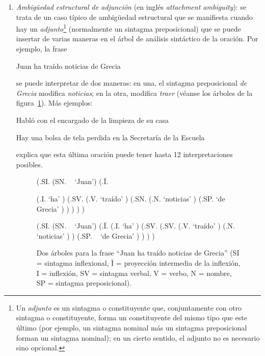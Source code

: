 \begin{enumerate}
\item \emph{Ambigüedad estructural de adjunción} (en inglés \emph{attachment ambiguity}): se trata de un caso típico de ambigüedad estructural que se manifiesta cuando hay un {\em adjunto}\footnote{Un \emph{adjunto} es un sintagma o constituyente que, conjuntamente con otro sintagma o constituyente, forma un constituyente del mismo tipo que este último (por ejemplo, un sintagma nominal más un sintagma preposicional forman un sintagma nominal); en un cierto sentido, el adjunto no es necesario sino opcional.} (normalmente un sintagma preposicional) que se puede insertar de varias maneras en el árbol de análisis sintáctico de la oración. Por ejemplo, la frase \begin{exemple} Juan ha traído noticias de Grecia \end{exemple} se puede interpretar de dos maneras: en una, el sintagma preposicional \emph{de Grecia} modifica \emph{noticias}; en la otra, modifica \emph{traer} (véanse los árboles de la figura~\ref{fg:noticies}). Más ejemplos: \begin{exemple} Habló con el encargado de la limpieza de su casa \end{exemple} \begin{exemple} Hay una bolsa de tela perdida en la Secretaría de la Escuela \label{ex:bossa} \end{exemple} \citet{tuson99b} explica que esta última oración puede tener hasta 12 interpretaciones posibles. 

\begin{figure} \begin{center} \begin{parsetree} (.SI. (SN. ~ `Juan') (.{\={I}}. 

(.I. `ha' ) (.SV. (.V. `traído' ) (.SN. (.N. `noticias' ) (.SP. `de Grecia' ) ) ) ) ) \end{parsetree} \end{center} \begin{center} \begin{parsetree} (.SI. (SN. ~ `Juan') (.{\={I}}. (.I. `ha' ) (.SV. (.SV. (.V. `traído' ) (.N. `noticias' ) ) (.SP. ~ `de Grecia' ) ) ) ) \end{parsetree} \end{center} \caption{Dos árboles para la frase ``Juan ha traído noticias de Grecia'' (SI = sintagma inflexional, \={I =} proyección intermedia de la inflexión, I = inflexión, SV = sintagma verbal, V = verbo, N = nombre, SP = sintagma preposicional). } \label{fg:noticies} \end{figure} \end{enumerate} 

